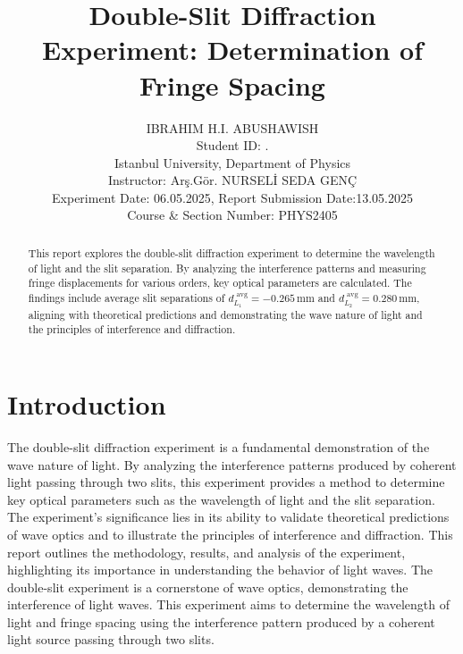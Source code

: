 \documentclass[journal]{IEEEtran}
\begin{document}
\title{Double-Slit Diffraction Experiment: Determination of Fringe Spacing}
\author{IBRAHIM H.I. ABUSHAWISH \\

{\small Student ID: \hspace{1.5cm}. \\ 
Istanbul University, Department of Physics \\
Instructor: Arş.Gör. NURSELİ SEDA GENÇ\\
Experiment Date: 06.05.2025, Report Submission Date:13.05.2025 \\
Course \& Section Number: PHYS2405}}


\maketitle
\begin{abstract}
    This report explores the double-slit diffraction experiment to determine the wavelength of light and the slit separation. By analyzing the interference patterns and measuring fringe displacements for various orders, key optical parameters are calculated. The findings include average slit separations of \( d_{L_1}^{\text{ avg}} = -0.265 \, \text{mm} \) and \( d_{L_2}^{\text{ avg}} = 0.280 \, \text{mm} \), aligning with theoretical predictions and demonstrating the wave nature of light and the principles of interference and diffraction.
\end{abstract}

\section{Introduction}
The double-slit diffraction experiment is a fundamental demonstration of the wave nature of light. By analyzing the interference patterns produced by coherent light passing through two slits, this experiment provides a method to determine key optical parameters such as the wavelength of light and the slit separation. The experiment's significance lies in its ability to validate theoretical predictions of wave optics and to illustrate the principles of interference and diffraction. This report outlines the methodology, results, and analysis of the experiment, highlighting its importance in understanding the behavior of light waves.
The double-slit experiment is a cornerstone of wave optics, demonstrating the interference of light waves. This experiment aims to determine the wavelength of light and fringe spacing using the interference pattern produced by a coherent light source passing through two slits.
\end{document}
